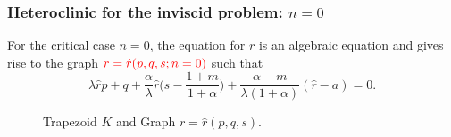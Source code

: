 \documentclass{beamer}
\def\red{\color{red}}
\def\blue{\color{blue}}
\begin{document}
\begin{frame}
 \frametitle{Heteroclinic for the inviscid problem: $n=0$}
 For the critical case $n=0$, the equation for $r$ is an algebraic equation and gives rise to the graph ${\red r=\hat{r}(p,q,s;n=0)}$ such that
 {\scriptsize
 $$\lambda \hat{r}p + q +\frac{\alpha}{\lambda}\hat{r}\big(s- \frac{1+m}{1+\alpha}\big) + \frac{\alpha-m}{\lambda(1+\alpha)}(\hat{r}-a) = 0.$$}
 
 \vskip -30pt
 \begin{figure}
 \centering
  \subfigure[Trapezoid $K$]{
  \texttt{[image: trapezoid.eps]}\label{fig:flow0b}
  }
  \quad \quad
  \subfigure[Affine contours $\hat{r}(p,q,s)=R$ in $pqs$-space]{
  \texttt{[image: Affine.eps]}\label{fig:flow0a}
  }
  \caption{Trapezoid $K$ and Graph $r=\hat{r}(p,q,s)$.} \label{fig:flow0} 
\end{figure}

\end{frame}
\end{document}
